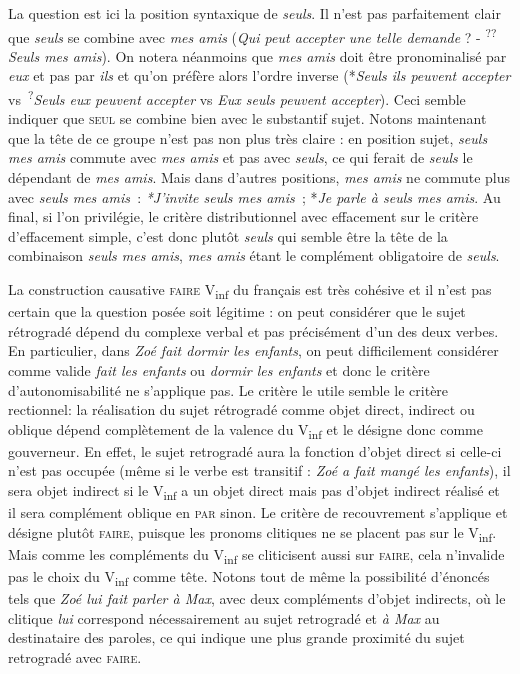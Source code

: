{\begin{exe}
     La question est ici la position syntaxique de \textit{seuls}. Il n’est pas parfaitement clair que \textit{seuls} se combine avec \textit{mes amis} (\textit{Qui peut accepter une telle demande} ? - \textsuperscript{??}\textit{Seuls mes amis}). On notera néanmoins que \textit{mes amis} doit être pronominalisé par \textit{eux} et pas par \textit{ils} et qu’on préfère alors l’ordre inverse (*\textit{Seuls ils peuvent accepter} vs~\textsuperscript{?}\textit{Seuls eux peuvent accepter} vs \textit{Eux seuls peuvent accepter}). Ceci semble indiquer que \textsc{seul} se combine bien avec le substantif sujet. Notons maintenant que la tête de ce groupe n’est pas non plus très claire : en position sujet, \textit{seuls mes amis} commute avec \textit{mes amis} et pas avec \textit{seuls}, ce qui ferait de \textit{seuls} le dépendant de \textit{mes amis}. Mais dans d’autres positions, \textit{mes amis} ne commute plus avec \textit{seuls mes amis~}: \textit{*J’invite seuls mes amis~}; *\textit{Je parle à seuls mes amis}. Au final, si l’on privilégie, le critère distributionnel avec effacement sur le critère d’effacement simple, c’est donc plutôt \textit{seuls} qui semble être la tête de la combinaison \textit{seuls mes amis}, \textit{mes amis} étant le complément obligatoire de \textit{seuls}.
    \end{exe}

     La construction causative \textsc{faire} V\textsubscript{inf} du français est très cohésive et il n’est pas certain que la question posée soit légitime : on peut considérer que le sujet rétrogradé dépend du complexe verbal et pas précisément d’un des deux verbes. En particulier, dans \textit{Zoé fait dormir les enfants}, on peut difficilement considérer comme valide \textit{fait les enfants} ou \textit{dormir les enfants} et donc le critère d’autonomisabilité ne s’applique pas. Le critère le utile semble le critère rectionnel: la réalisation du sujet rétrogradé comme objet direct, indirect ou oblique dépend complètement de la valence du V\textsubscript{inf} et le désigne donc comme gouverneur. En effet, le sujet retrogradé aura la fonction d’objet direct si celle-ci n’est pas occupée (même si le verbe est transitif : \textit{Zoé a fait mangé les enfants}), il sera objet indirect si le V\textsubscript{inf} a un objet direct mais pas d’objet indirect réalisé et il sera complément oblique en \textsc{par} sinon. Le critère de recouvrement s’applique et désigne plutôt \textsc{faire}, puisque les pronoms clitiques ne se placent pas sur le V\textsubscript{inf}. Mais comme les compléments du V\textsubscript{inf} se cliticisent aussi sur \textsc{faire}, cela n’invalide pas le choix du V\textsubscript{inf} comme tête. Notons tout de même la possibilité d'énoncés tels que \textit{Zoé lui fait parler à Max}, avec deux compléments d'objet indirects, où
    le clitique \textit{lui} correspond nécessairement au sujet retrogradé et \textit{à Max} au destinataire des paroles, ce qui indique une plus grande proximité du sujet retrogradé avec \textsc{faire}.

}
